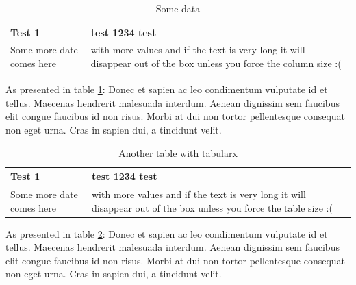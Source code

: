 \documentclass[11pt,a4paper,oneside,article]{memoir}
\begin{document}
\begin{table}[h]
  \centering
  \caption{Some data}
  \begin{tabular}{| l | >{\centering\arraybackslash}p{} |}
    \hline
    Test 1 & test 1234 test \\
    \hline
    Some more date comes here & with more values and if the text is very long it will disappear out of the box unless you force the column size :( \\
    \hline
  \end{tabular}
  \label{table:some_data}
\end{table}


As presented in table \ref{table:some_data}: Donec et sapien ac leo condimentum vulputate id et tellus. Maecenas hendrerit malesuada interdum. Aenean dignissim sem faucibus elit congue faucibus id non risus. Morbi at dui non tortor pellentesque consequat non eget urna. Cras in sapien dui, a tincidunt velit.

\begin{table}[h]
  \centering
  \caption{Another table with tabularx}
  \begin{tabularx}{.95\textwidth}{| l | >{\centering\arraybackslash} X |}
    \hline
    Test 1 & test 1234 test \\
    \hline
    Some more date comes here & with more values and if the text is very long it will disappear out of the box unless you force the table size :( \\
    \hline
  \end{tabularx}
  \label{table:some_data2}
\end{table}

As presented in table \ref{table:some_data2}: Donec et sapien ac leo condimentum vulputate id et tellus. Maecenas hendrerit malesuada interdum. Aenean dignissim sem faucibus elit congue faucibus id non risus. Morbi at dui non tortor pellentesque consequat non eget urna. Cras in sapien dui, a tincidunt velit.





\begin{flushleft}
\begin{singlespacing}

\end{singlespacing}
\end{flushleft}
\end{document}
